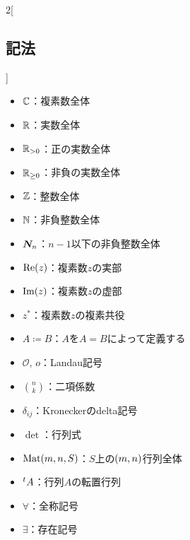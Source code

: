 \documentclass[b5paper,draft,oneside,openany]{ltjsbook} %
\begin{document}
\columnseprule=0.5pt
\begin{multicols}{2}[\subsection*{記法}]
    \begin{itemize}
        \item $\mathbb{C}$：複素数全体
        \item $\mathbb{R}$：実数全体
        \item $\mathbb{R}_{> 0}$：正の実数全体
        \item $\mathbb{R}_{\geq 0}$：非負の実数全体
        \item $\mathbb{Z}$：整数全体
        \item $\mathbb{N}$：非負整数全体
        \item $\bm{N}_{n}$：$n-1$以下の非負整数全体
        \item $\re{z}$：複素数$z$の実部
        \item $\im{z}$：複素数$z$の虚部
        \item $z^*$：複素数$z$の複素共役
        \item $A\coloneqq B$：$A$を$A=B$によって定義する
        \item $\mathcal{O}$, $o$：Landau記号
        \item $\binom{n}{k}$：二項係数
        \item $\delta_{ij}$：Kroneckerのdelta記号
        \item $\det$：行列式
        \item $\Mat{m}{n}{S}$：$S$上の$\pare{m,n}$行列全体
        \item ${}^t{A}$：行列$A$の転置行列
        \item $\forall$：全称記号
        \item $\exists$：存在記号
    \end{itemize}
\end{multicols}
\columnseprule=0.0pt
\end{document}
